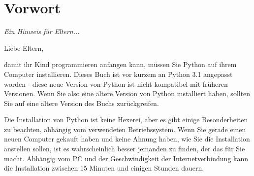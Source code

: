 

\chapter*{Vorwort}\normalsize
\begin{center}
{\em Ein Hinweis für Eltern...}
\end{center}
\pagestyle{plain}

\noindent
Liebe Eltern,

damit ihr Kind programmieren anfangen kann, müssen Sie Python auf ihrem Computer installieren. Dieses Buch ist vor kurzem an Python 3.1 angepasst worden - diese neue Version von Python ist nicht kompatibel mit früheren Versionen. Wenn Sie also eine ältere Version von Python installiert haben, sollten Sie auf eine ältere Version des Buchs zurückgreifen.

Die Installation von Python ist keine Hexerei, aber es gibt einige Besonderheiten zu beachten, abhängig vom verwendeten Betriebssystem. Wenn Sie gerade einen neuen Computer gekauft haben und keine Ahnung haben, wie Sie die Installation anstellen sollen, ist es wahrscheinlich besser jemanden zu finden, der das für Sie macht. Abhängig vom PC und der Geschwindigkeit der Internetverbindung kann die Installation zwischen 15 Minuten und einigen Stunden dauern.

